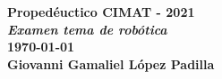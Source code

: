 
\textbf{Propedéuctico CIMAT - 2021\\
    \textit{Examen tema de robótica}}\\

\textbf{\today}
\\

\textbf{Giovanni Gamaliel López Padilla}\\